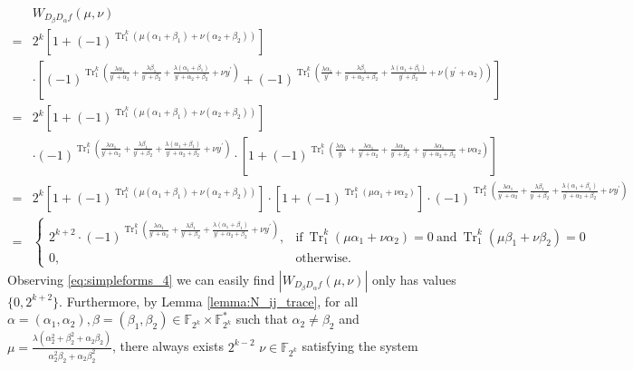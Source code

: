 \documentclass{article}
\newcommand{\F}{\mathbb{F}}
\newcommand{\TRACE}{\operatorname{Tr}_1^k}
\theoremstyle{nonumberplain}
\newcommand{\0}{\textbf{0}}
\newcommand{\1}{\textbf{1}}
\begin{document}
    \begin{align}\label{eq:simpleforms_4}
        &W_{D_{\beta}D_{\alpha}f}(\mu,\nu)\nonumber\\
        =&2^k\left[1+(-1)^{\TRACE\left(\mu(\alpha_1+\beta_1)+\nu (\alpha_2+\beta_2)\right)}\right]\nonumber\\
        &\cdot
        \left[(-1)^{\TRACE\left(\frac{\lambda\alpha_1}{y^{\prime}+\alpha_2}+\frac{\lambda\beta_1}{y^{\prime}+\beta_2}+\frac{\lambda(\alpha_1+\beta_1)}{y^{\prime}+\alpha_2+\beta_2}+\nu y^{\prime}\right)}+
        (-1)^{\TRACE\left(\frac{\lambda\alpha_1}{y^{\prime}}+\frac{\lambda\beta_1}{y^{\prime}+\alpha_2+\beta_2}+\frac{\lambda(\alpha_1+\beta_1)}{y^{\prime}+\beta_2}+\nu (y^{\prime}+\alpha_2)\right)}\right]\nonumber\\
        =&2^k\left[1+(-1)^{\TRACE\left(\mu(\alpha_1+\beta_1)+\nu (\alpha_2+\beta_2)\right)}\right]\nonumber\\
        &\cdot
        (-1)^{\TRACE\left(\frac{\lambda\alpha_1}{y^{\prime}+\alpha_2}+\frac{\lambda\beta_1}{y^{\prime}+\beta_2}+\frac{\lambda(\alpha_1+\beta_1)}{y^{\prime}+\alpha_2+\beta_2}+\nu y^{\prime}\right)}\cdot
        \left[1+(-1)^{\TRACE\left(\frac{\lambda\alpha_1}{y^{\prime}}+\frac{\lambda\alpha_1}{y^{\prime}+\alpha_2}+\frac{\lambda\alpha_1}{y^{\prime}+\beta_2}+\frac{\lambda\alpha_1}{y^{\prime}+\alpha_2+\beta_2}+\nu\alpha_2\right)}\right]\nonumber\\
        =&2^k\left[1+(-1)^{\TRACE\left(\mu(\alpha_1+\beta_1)+\nu (\alpha_2+\beta_2)\right)}\right]\cdot
        \left[1+(-1)^{\TRACE\left(\mu\alpha_1+\nu\alpha_2\right)}\right]\cdot
        (-1)^{\TRACE\left(\frac{\lambda\alpha_1}{y^{\prime}+\alpha_2}+\frac{\lambda\beta_1}{y^{\prime}+\beta_2}+\frac{\lambda(\alpha_1+\beta_1)}{y^{\prime}+\alpha_2+\beta_2}+\nu y^{\prime}\right)}\nonumber\\
        =&\begin{cases}
            2^{k+2}\cdot(-1)^{\TRACE\left(\frac{\lambda\alpha_1}{y^{\prime}+\alpha_2}+\frac{\lambda\beta_1}{y^{\prime}+\beta_2}+\frac{\lambda(\alpha_1+\beta_1)}{y^{\prime}+\alpha_2+\beta_2}+\nu y^{\prime}\right)},&\text{if}~\TRACE\left(\mu\alpha_1+\nu\alpha_2\right)=0 ~
            \text{and}~\TRACE\left(\mu\beta_1+\nu\beta_2\right)=0 \\
            0,~&\text{otherwise}.
        \end{cases}
    \end{align}
    Observing \eqref{eq:simpleforms_4} we can easily find $ |W_{D_{\beta}D_{\alpha}f}(\mu,\nu)| $ only 
    has values $ \{0,2^{k+2}\} $. 
    Furthermore, by Lemma \ref{lemma:N_ij_trace}, 
    for all $ \alpha=(\alpha_1,\alpha_2),\beta=(\beta_1,\beta_2)\in\F_{2^k}\times\F_{2^k}^* $ such that 
    $ \alpha_2\ne\beta_2 $ and $ \mu=\frac{\lambda(\alpha_2^2+\beta_2^2+\alpha_2\beta_2)}{\alpha_2^2\beta_2+\alpha_2\beta_2^2} $, 
    there always exists $ 2^{k-2} $  $ \nu\in\F_{2^k} $ satisfying the system
    
\end{document}
